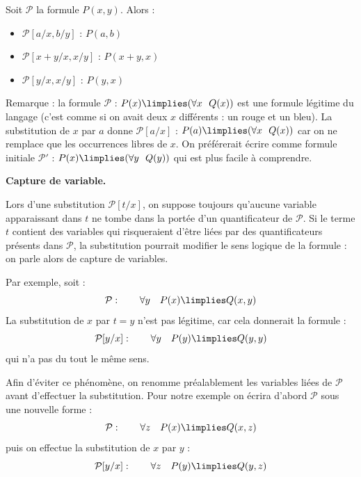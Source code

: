 \documentclass[11pt,class=report,crop=false]{standalone}
\begin{document}
\begin{exemple}
Soit $\mathcal{P}$ la formule \og{}$P(x,y)$\fg{}. Alors :
\begin{itemize}
	
	\item $\mathcal{P}[a/x, b/y]$ : $P(a,b)$
	
	\item $\mathcal{P}[x+y/x,x/y]$ : $P(x+y,x)$
	
	\item $\mathcal{P}[y/x,x/y]$ : $P(y,x)$
\end{itemize}
\end{exemple}

Remarque : la formule $\mathcal{P}$ : \og{}$P(x) \limplies (\forall x \ \ Q(x))$\fg{} est une formule légitime du langage (c'est comme si on avait deux $x$ différents : un rouge et un bleu).
La substitution de $x$ par $a$ donne $\mathcal{P}[a/x]$ : \og{}$P(a) \limplies (\forall x \ \ Q(x))$\fg{} car on ne remplace que les occurrences libres de $x$. 
On préférerait écrire comme formule initiale $\mathcal{P}'$ : \og{}$P(x) \limplies (\forall y \ \ Q(y))$\fg{} qui est plus facile à comprendre.


\medskip
\noindent\textbf{Capture de variable.}

Lors d'une substitution $\mathcal{P}[t/x]$, on suppose toujours qu'aucune variable apparaissant dans $t$ ne tombe dans la portée d'un quantificateur de $\mathcal{P}$.
Si le terme $t$ contient des variables qui risqueraient d'être liées par des quantificateurs présents dans $\mathcal{P}$, la substitution pourrait modifier le sens logique de la formule : on parle alors de capture de variables.

Par exemple, soit :
\[
\mathcal{P} : \qquad 
\forall y \quad  P(x) \limplies Q(x,y)
\]
La substitution de $x$ par $t=y$ n'est pas légitime, car cela donnerait la formule :
\[
\mathcal{P}[y/x] : \qquad 
\forall y \quad  P(y) \limplies Q(y,y)
\]
qui n'a pas du tout le même sens.

Afin d'éviter ce phénomène, on renomme préalablement les variables liées de $\mathcal{P}$ avant d'effectuer la substitution.
Pour notre exemple on écrira d'abord $\mathcal{P}$ sous une nouvelle forme :
\[
\mathcal{P} : \qquad 
\forall z \quad  P(x) \limplies Q(x,z)
\]
puis on effectue la substitution de $x$ par $y$ :
\[
\mathcal{P}[y/x] : \qquad 
\forall z \quad  P(y) \limplies Q(y,z)
\]

\end{document}
